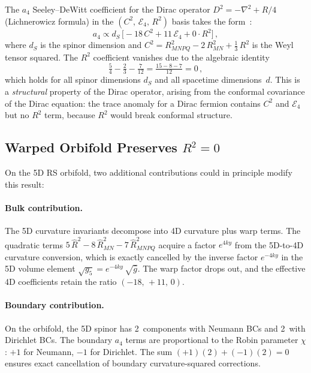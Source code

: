 The $a_4$ Seeley--DeWitt coefficient for the Dirac operator $D^2 = -\nabla^2 + R/4$ (Lichnerowicz formula) in the $(C^2,\, \mathcal{E}_4,\, R^2)$ basis takes the form~\cite{ch4:Vassilevich2003,ch4:Gilkey1984}:
\begin{equation}
  a_4 \propto d_S\, \bigl[-18\, C^2 + 11\, \mathcal{E}_4 + 0 \cdot R^2\bigr]\,,
  \label{eq:4-113}
\end{equation}
where $d_S$ is the spinor dimension and $C^2 = R_{MNPQ}^2 - 2\, R_{MN}^2 + \tfrac{1}{3}\, R^2$ is the Weyl tensor squared. The $R^2$ coefficient vanishes due to the algebraic identity
\begin{equation}
  \tfrac{5}{4} - \tfrac{2}{3} - \tfrac{7}{12} = \tfrac{15 - 8 - 7}{12} = 0\,,
  \label{eq:4-114}
\end{equation}
which holds for all spinor dimensions $d_S$ and all spacetime dimensions~$d$. This is a \emph{structural} property of the Dirac operator, arising from the conformal covariance of the Dirac equation: the trace anomaly for a Dirac fermion contains $C^2$ and $\mathcal{E}_4$ but no $R^2$ term, because $R^2$ would break conformal structure.

\subsection{Warped Orbifold Preserves $R^2 = 0$}
\label{sec:4-r2-warped}

On the 5D RS orbifold, two additional contributions could in principle modify this result:

\paragraph{Bulk contribution.} The 5D curvature invariants decompose into 4D curvature plus warp terms. The quadratic terms $5\, \hat{R}^2 - 8\, \hat{R}_{MN}^2 - 7\, \hat{R}_{MNPQ}^2$ acquire a factor $e^{4ky}$ from the 5D-to-4D curvature conversion, which is exactly cancelled by the inverse factor $e^{-4ky}$ in the 5D volume element $\sqrt{g_5} = e^{-4ky}\, \sqrt{\hat{g}}$. The warp factor drops out, and the effective 4D coefficients retain the ratio $(-18,\, +11,\, 0)$.

\paragraph{Boundary contribution.} On the orbifold, the 5D spinor has 2~components with Neumann BCs and 2~with Dirichlet BCs. The boundary $a_4$ terms are proportional to the Robin parameter $\chi$: $+1$ for Neumann, $-1$ for Dirichlet. The sum $(+1)(2) + (-1)(2) = 0$ ensures exact cancellation of boundary curvature-squared corrections.

